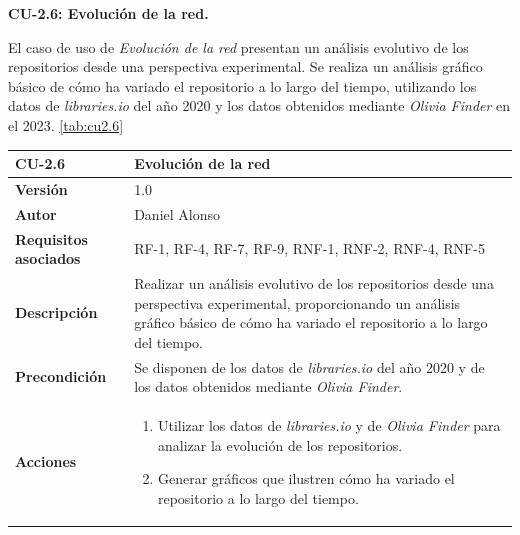\textbf{CU-2.6: Evolución de la red.}

El caso de uso de \textit{Evolución de la red} presentan un análisis evolutivo de los repositorios
desde una perspectiva experimental. Se realiza un análisis gráfico
básico de cómo ha variado el repositorio a lo largo del tiempo, utilizando los datos
de \textit{libraries.io}\cite{jeremy_katz_2020_3626071} del año 2020 y los datos obtenidos mediante \textit{Olivia Finder} en el 2023. \ref{tab:cu2.6}


\begin{table}[p]
	\centering
	\begin{tabularx}{\linewidth}{ p{} p{} }
		\toprule
		\textbf{CU-2.6}               & \textbf{Evolución de la red}                                                                                                                                                              \\
		\toprule
		\textbf{Versión}              & 1.0                                                                                                                                                                                       \\
		\textbf{Autor}                & Daniel Alonso                                                                                                                                                                             \\
		\textbf{Requisitos asociados} & RF-1, RF-4, RF-7, RF-9, RNF-1, RNF-2, RNF-4, RNF-5                                                                                                                                        \\
		\textbf{Descripción}          & Realizar un análisis evolutivo de los repositorios desde una perspectiva experimental, proporcionando un análisis gráfico básico de cómo ha variado el repositorio a lo largo del tiempo. \\
		\textbf{Precondición}         & Se disponen de los datos de \textit{libraries.io} del año 2020 y de los datos obtenidos mediante \textit{Olivia Finder}.                                                                  \\
		\textbf{Acciones}             & \begin{enumerate}
			                                \item Utilizar los datos de \textit{libraries.io} y de \textit{Olivia Finder} para analizar la evolución de los repositorios.
			                                \item Generar gráficos que ilustren cómo ha variado el repositorio a lo largo del tiempo.

\end{enumerate}
\end{tabularx}
\end{table}
